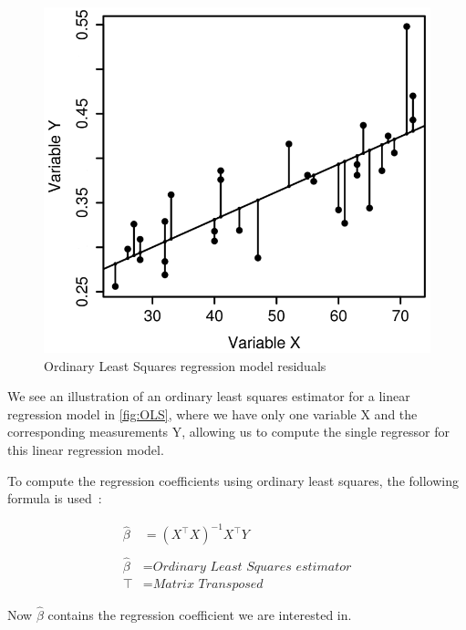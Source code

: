 \begin{figure}[H]
    \centering
    \includegraphics[scale=0.3]{gfx/OLS.png}
    \caption[Ordinary Least Squares regression model residuals]
    {Ordinary Least Squares regression model residuals
    \footnotemark}
    \label{fig:OLS}
\end{figure}

We see an illustration of an ordinary least squares estimator for a linear regression model in \autoref{fig:OLS}, where we have only one variable 
X and the corresponding measurements Y, allowing us to compute the single regressor for this linear regression model.

To compute the regression coefficients using ordinary least squares, the following formula is used~\cite{Linear-Regression}:

\begin{align}
    \hat{\beta} &=  (\textit{X}^{\top } \textit{X} )^{-1}\textit{X}^{\top} Y \\ \nonumber \\\nonumber
    \hat{\beta} &= \textit{Ordinary Least Squares estimator}\\\nonumber
    \top &= \textit{Matrix Transposed}\nonumber
\end{align}\label{equ:ols}

Now $\hat{\beta}$ contains the regression coefficient we are interested in.

